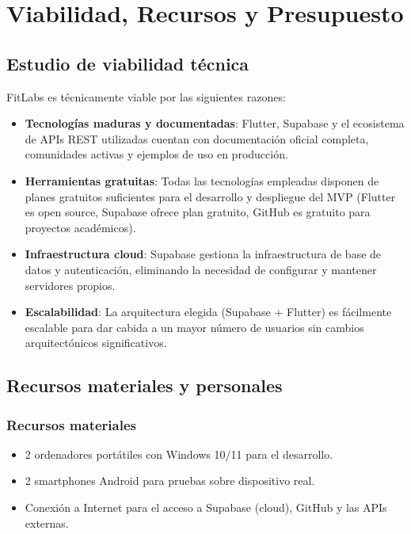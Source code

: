 \chapter{Viabilidad, Recursos y Presupuesto}

\section{Estudio de viabilidad técnica}

FitLabs es técnicamente viable por las siguientes razones:

\begin{itemize}
  \item \textbf{Tecnologías maduras y documentadas}: Flutter, Supabase y el ecosistema de APIs REST utilizadas cuentan con documentación oficial completa, comunidades activas y ejemplos de uso en producción.
  \item \textbf{Herramientas gratuitas}: Todas las tecnologías empleadas disponen de planes gratuitos suficientes para el desarrollo y despliegue del MVP (Flutter es open source, Supabase ofrece plan gratuito, GitHub es gratuito para proyectos académicos).
  \item \textbf{Infraestructura cloud}: Supabase gestiona la infraestructura de base de datos y autenticación, eliminando la necesidad de configurar y mantener servidores propios.
  \item \textbf{Escalabilidad}: La arquitectura elegida (Supabase + Flutter) es fácilmente escalable para dar cabida a un mayor número de usuarios sin cambios arquitectónicos significativos.
\end{itemize}

\section{Recursos materiales y personales}

\subsection{Recursos materiales}

\begin{itemize}
  \item 2 ordenadores portátiles con Windows 10/11 para el desarrollo.
  \item 2 smartphones Android para pruebas sobre dispositivo real.
  \item Conexión a Internet para el acceso a Supabase (cloud), GitHub y las APIs externas.
\end{itemize}

